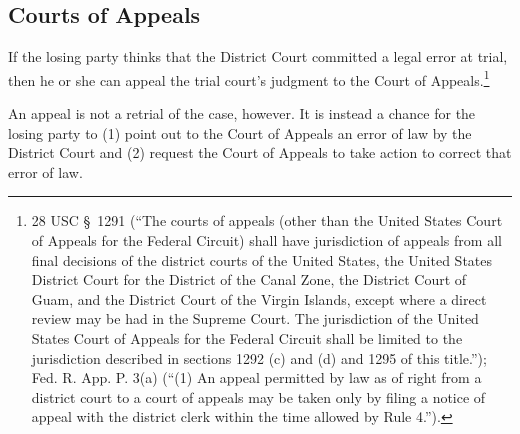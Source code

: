 \subsection{Courts of Appeals}
If the losing party thinks that the District Court committed a legal error at trial, then he or she can appeal the trial court's judgment to the Court of Appeals.\footnote{28 USC \S\ 1291 (``The courts of appeals (other than the United States Court of Appeals for the Federal Circuit) shall have jurisdiction of appeals from all final decisions of the district courts of the United States, the United States District Court for the District of the Canal Zone, the District Court of Guam, and the District Court of the Virgin Islands, except where a direct review may be had in the Supreme Court. The jurisdiction of the United States Court of Appeals for the Federal Circuit shall be limited to the jurisdiction described in sections 1292 (c) and (d) and 1295 of this title.''); Fed. R. App. P. 3(a) (``(1) An appeal permitted by law as of right from a district court to a court of appeals may be taken only by filing a notice of appeal with the district clerk within the time allowed by Rule 4.'').}  

An appeal is not a retrial of the case, however.  It is instead a chance for the losing party to (1) point out to the Court of Appeals an error of law by the District Court and (2) request the Court of Appeals to take action to correct that error of law.

